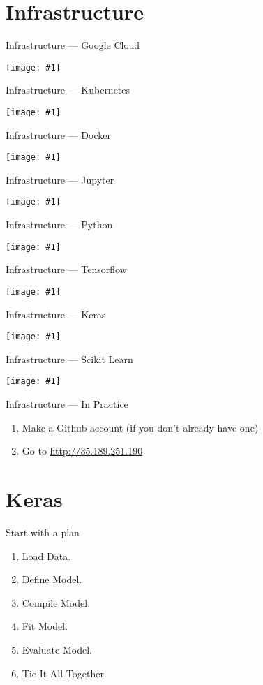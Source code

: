 \documentclass{beamer}
\newcommand\cimgsm[1]{\vfill\centerline{\texttt{[image: \#1]}}\vfill}
\begin{document}
\section{Infrastructure}
\label{sec:infra}
\begin{frame}{Infrastructure --- Google Cloud}
  \cimgsm{google-cloud.png}
\end{frame}
\begin{frame}{Infrastructure --- Kubernetes}
  \cimgsm{kubernetes.png}
\end{frame}
\begin{frame}{Infrastructure --- Docker}
  \cimgsm{docker.jpg}
\end{frame}
\begin{frame}{Infrastructure --- Jupyter}
  \cimgsm{jupyter.png}
\end{frame}
\begin{frame}{Infrastructure --- Python}
  \cimgsm{python.png}
\end{frame}
\begin{frame}{Infrastructure --- Tensorflow}
  \cimgsm{tensorflow.png}
\end{frame}
\begin{frame}{Infrastructure --- Keras}
  \cimgsm{keras.jpg}
\end{frame}
\begin{frame}{Infrastructure --- Scikit Learn}
  \cimgsm{scikit.png}
\end{frame}
\begin{frame}{Infrastructure --- In Practice}
  \begin{enumerate}
  \item Make a Github account (if you don't already have one)
  \item Go to \url{http://35.189.251.190}
  \end{enumerate}
\end{frame}


\section{Keras}
\label{sec:keras}
\begin{frame}{Start with a plan}
\begin{enumerate}
\item Load Data.
\item Define Model.
\item Compile Model.
\item Fit Model.
\item Evaluate Model.
\item Tie It All Together.
\end{enumerate}
\end{frame}
\end{document}
